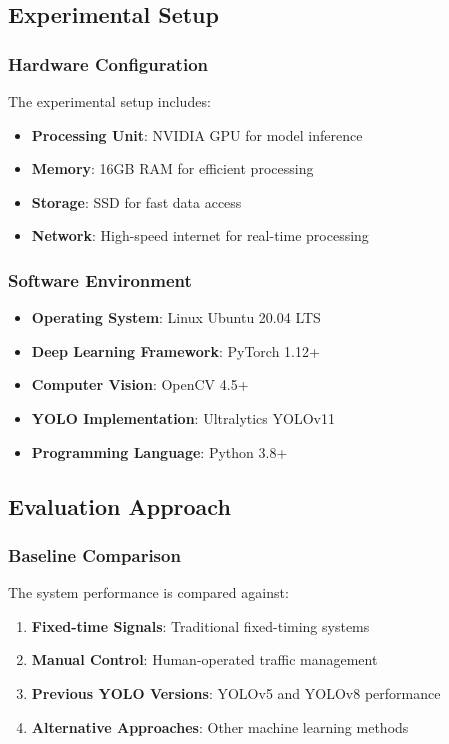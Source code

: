 \subsection{Experimental Setup}

\subsubsection{Hardware Configuration}

The experimental setup includes:

\begin{itemize}
    \item \textbf{Processing Unit}: NVIDIA GPU for model inference
    \item \textbf{Memory}: 16GB RAM for efficient processing
    \item \textbf{Storage}: SSD for fast data access
    \item \textbf{Network}: High-speed internet for real-time processing
\end{itemize}

\subsubsection{Software Environment}

\begin{itemize}
    \item \textbf{Operating System}: Linux Ubuntu 20.04 LTS
    \item \textbf{Deep Learning Framework}: PyTorch 1.12+
    \item \textbf{Computer Vision}: OpenCV 4.5+
    \item \textbf{YOLO Implementation}: Ultralytics YOLOv11
    \item \textbf{Programming Language}: Python 3.8+
\end{itemize}

\subsection{Evaluation Approach}

\subsubsection{Baseline Comparison}

The system performance is compared against:

\begin{enumerate}
    \item \textbf{Fixed-time Signals}: Traditional fixed-timing systems
    \item \textbf{Manual Control}: Human-operated traffic management
    \item \textbf{Previous YOLO Versions}: YOLOv5 and YOLOv8 performance
    \item \textbf{Alternative Approaches}: Other machine learning methods
\end{enumerate}

